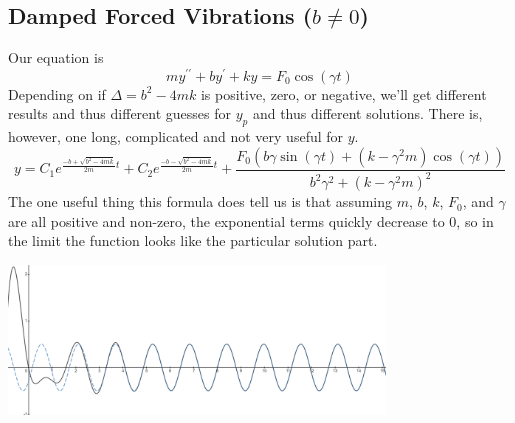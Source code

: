 \subsection{Damped Forced Vibrations ($b \neq 0$)}
\noindent
Our equation is 
\begin{equation*}
	my^{\prime\prime} + by^{\prime} + ky = F_0\cos{(\gamma t)}
\end{equation*}
Depending on if $\Delta = b^2 - 4mk$ is positive, zero, or negative, we'll get different results and thus different guesses for $y_p$ and thus different solutions. There is, however, one long, complicated and not very useful for $y$.
\begin{equation*}
	y = C_1e^{\frac{-b+\sqrt{b^2-4mk}}{2m}t} + C_2e^{\frac{-b-\sqrt{b^2-4mk}}{2m}t} +
	 \frac{F_0\left(b\gamma\sin{(\gamma t)} + \left(k-\gamma^2m\right)\cos{(\gamma t)}\right)}{b^2\gamma^2 + (k-\gamma^2m)^2}
\end{equation*}
The one useful thing this formula does tell us is that assuming $m$, $b$, $k$, $F_0$, and $\gamma$ are all positive and non-zero, the exponential terms quickly decrease to 0, so in the limit the function looks like the particular solution part.

\begin{center}
	\includegraphics[width=0.75\textwidth]{./higherOrder/forcedVibrs/damped_forced.png}
\end{center}

\ifodd{}\fi